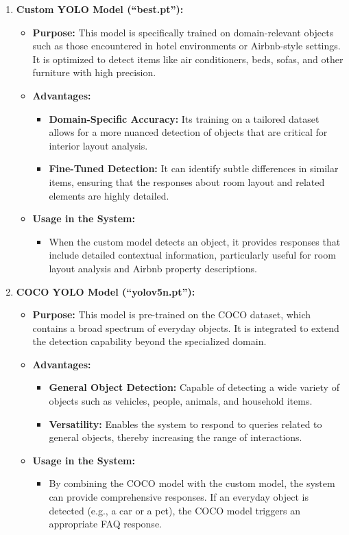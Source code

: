 \documentclass[12pt]{article}
\begin{document}
\begin{enumerate}[label=\arabic*.]
    \item \textbf{Custom YOLO Model (``best.pt''):}
    \begin{itemize}
        \item \textbf{Purpose:} This model is specifically trained on domain-relevant objects such as those encountered in hotel environments or Airbnb-style settings. It is optimized to detect items like air conditioners, beds, sofas, and other furniture with high precision.
        \item \textbf{Advantages:}
        \begin{itemize}
            \item \textbf{Domain-Specific Accuracy:} Its training on a tailored dataset allows for a more nuanced detection of objects that are critical for interior layout analysis.
            \item \textbf{Fine-Tuned Detection:} It can identify subtle differences in similar items, ensuring that the responses about room layout and related elements are highly detailed.
        \end{itemize}
        \item \textbf{Usage in the System:} 
        \begin{itemize}
            \item When the custom model detects an object, it provides responses that include detailed contextual information, particularly useful for room layout analysis and Airbnb property descriptions.
        \end{itemize}
    \end{itemize}
    
    \item \textbf{COCO YOLO Model (``yolov5n.pt''):}
    \begin{itemize}
        \item \textbf{Purpose:} This model is pre-trained on the COCO dataset, which contains a broad spectrum of everyday objects. It is integrated to extend the detection capability beyond the specialized domain.
        \item \textbf{Advantages:}
        \begin{itemize}
            \item \textbf{General Object Detection:} Capable of detecting a wide variety of objects such as vehicles, people, animals, and household items.
            \item \textbf{Versatility:} Enables the system to respond to queries related to general objects, thereby increasing the range of interactions.
        \end{itemize}
        \item \textbf{Usage in the System:} 
        \begin{itemize}
            \item By combining the COCO model with the custom model, the system can provide comprehensive responses. If an everyday object is detected (e.g., a car or a pet), the COCO model triggers an appropriate FAQ response.
        \end{itemize}
    \end{itemize}
\end{enumerate}
\end{document}
